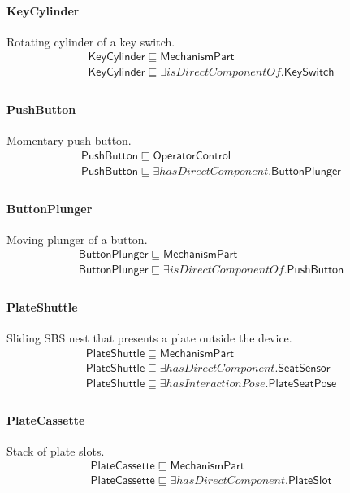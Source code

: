 \documentclass[10pt]{article}
\begin{document}
\paragraph{KeyCylinder} Rotating cylinder of a key switch.
\[\begin{array}{l}
\mathsf{KeyCylinder} \sqsubseteq  \mathsf{MechanismPart} \\
\mathsf{KeyCylinder} \sqsubseteq  \exists \mathit{isDirectComponentOf}.\mathsf{KeySwitch} \\
\end{array}\]
\paragraph{PushButton} Momentary push button.
\[\begin{array}{l}
\mathsf{PushButton} \sqsubseteq  \mathsf{OperatorControl} \\
\mathsf{PushButton} \sqsubseteq  \exists \mathit{hasDirectComponent}.\mathsf{ButtonPlunger} \\
\end{array}\]
\paragraph{ButtonPlunger} Moving plunger of a button.
\[\begin{array}{l}
\mathsf{ButtonPlunger} \sqsubseteq  \mathsf{MechanismPart} \\
\mathsf{ButtonPlunger} \sqsubseteq  \exists \mathit{isDirectComponentOf}.\mathsf{PushButton} \\
\end{array}\]
\paragraph{PlateShuttle} Sliding SBS nest that presents a plate outside the device.
\[\begin{array}{l}
\mathsf{PlateShuttle} \sqsubseteq  \mathsf{MechanismPart} \\
\mathsf{PlateShuttle} \sqsubseteq  \exists \mathit{hasDirectComponent}.\mathsf{SeatSensor} \\
\mathsf{PlateShuttle} \sqsubseteq  \exists \mathit{hasInteractionPose}.\mathsf{PlateSeatPose} \\
\end{array}\]
\paragraph{PlateCassette} Stack of plate slots.
\[\begin{array}{l}
\mathsf{PlateCassette} \sqsubseteq  \mathsf{MechanismPart} \\
\mathsf{PlateCassette} \sqsubseteq  \exists \mathit{hasDirectComponent}.\mathsf{PlateSlot} \\
\end{array}\]
\end{document}
